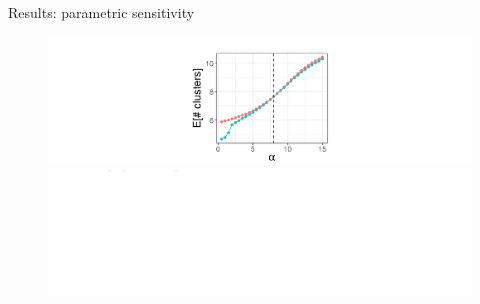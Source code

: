 \documentclass[10pt]{beamer}\usepackage[]{graphicx}\usepackage[]{color}
\newenvironment{knitrout}{}{} %
\begin{document}
\begin{frame}{Results: parametric sensitivity}

\begin{figure}
\centering
\begin{knitrout}
\color{fgcolor}

{\centering \includegraphics[width=0.98\linewidth,height=0.294\linewidth]{masked_results_fig/param_sens_plot_thresh_0_masked1-2} 

}



\end{knitrout}
\begin{knitrout}
\color{fgcolor}

{\centering \includegraphics[width=0.98\linewidth,height=0.294\linewidth]{masked_results_fig/param_sens_plot_thresh_0b_masked-1} 

}



\end{knitrout}
\end{figure}

\end{frame}
\end{document}
